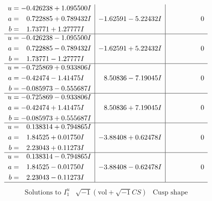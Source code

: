 \documentclass[1p]{elsarticle_modified}
\theoremstyle{definition}
\newcommand{\I}{\sqrt{-1}}
\begin{document}
$$\begin{array}{c|c|c}
\begin{aligned}
u &= -0.426238 + 1.095500 I \\
a &= \phantom{-}0.722885 + 0.789432 I \\
b &= \phantom{-}1.73771 + 1.27777 I\end{aligned}
 & -1.62591 - 5.22432 I & \phantom{-0.000000 } 0 \\ \hline\begin{aligned}
u &= -0.426238 - 1.095500 I \\
a &= \phantom{-}0.722885 - 0.789432 I \\
b &= \phantom{-}1.73771 - 1.27777 I\end{aligned}
 & -1.62591 + 5.22432 I & \phantom{-0.000000 } 0 \\ \hline\begin{aligned}
u &= -0.725869 + 0.933806 I \\
a &= -0.42474 - 1.41475 I \\
b &= -0.085973 - 0.555687 I\end{aligned}
 & \phantom{-}8.50836 - 7.19045 I & \phantom{-0.000000 } 0 \\ \hline\begin{aligned}
u &= -0.725869 - 0.933806 I \\
a &= -0.42474 + 1.41475 I \\
b &= -0.085973 + 0.555687 I\end{aligned}
 & \phantom{-}8.50836 + 7.19045 I & \phantom{-0.000000 } 0 \\ \hline\begin{aligned}
u &= \phantom{-}0.138314 + 0.794865 I \\
a &= \phantom{-}1.84525 + 0.01750 I \\
b &= \phantom{-}2.23043 + 0.11273 I\end{aligned}
 & -3.88408 + 0.62478 I & \phantom{-0.000000 } 0 \\ \hline\begin{aligned}
u &= \phantom{-}0.138314 - 0.794865 I \\
a &= \phantom{-}1.84525 - 0.01750 I \\
b &= \phantom{-}2.23043 - 0.11273 I\end{aligned}
 & -3.88408 - 0.62478 I & \phantom{-0.000000 } 0\\
 \hline 
 \end{array}$$\newpage$$\begin{array}{c|c|c}  
\text{Solutions to }I^u_{1}& \I (\text{vol} + \sqrt{-1}CS) & \text{Cusp shape}\\
 \hline 
\begin{aligned}

\end{aligned}
\end{array}$$
\end{document}
